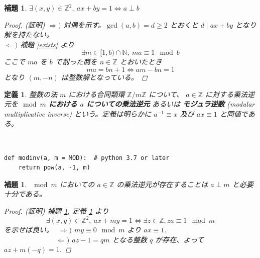 \documentclass[12pt, a4j]{ltjsarticle}
\newtheorem{lem}[thm]{補題}
\newtheorem{defi}[thm]{定義}
\newcommand*{\ZZ}{\mathbb{Z}}
\begin{document}
\begin{lem} $\exists (x,y)\in\mathbb{Z}^2,\ ax+by=1 \Longleftrightarrow a\perp b$ \label{dout2}
\begin{proof} (証明) $\Longrightarrow)$ 対偶を示す。$\gcd(a,b)=d\ge2$ とおくと $d \mid ax+by$ となり解を持たない。 \\
$\Longleftarrow)$ 補題 \ref{exists} より
\begin{equation}
\exists m \in [1,b)\cap\mathbb{N},\ ma\equiv 1 \mod b
\end{equation}
ここで $ma$ を $b$ で割った商を $n\in\mathbb{Z}$ とおいたとき\\
\begin{equation}
ma=bn+1 \Longleftrightarrow am-bn = 1
\end{equation}
となり $(m,-n)$ は整数解となっている。
\end{proof}
\end{lem}

\vspace{1cm}

\begin{defi} \label{modulardef}
整数の法 $m$ における合同類環 $\ZZ/m\ZZ$ について、 $a\in\ZZ$ に対する乗法逆元を{\bf \mbox{\boldmath $\mod m$} における \mbox{\boldmath $a$} についての乗法逆元} あるいは {\bf モジュラ逆数} (modular multiplicative inverse) という。定義は明らかに $a^{-1}\equiv x$ 及び $ax\equiv 1$ と同値である。
\end{defi}
\\
\begin{lstlisting}
def modinv(a, m = MOD):  # python 3.7 or later
    return pow(a, -1, m)
\end{lstlisting}

\vspace{1cm}

\begin{lem} \label{dout}
$\mod m$ においての $a\in\ZZ$ の乗法逆元が存在することは $a \perp m$ と必要十分である。
\begin{proof}(証明)	\itshape
補題 \ref{dout2}, 定義 \ref{modulardef} より
\begin{equation}
\exists (x,y)\in\ZZ^2,\ ax+my=1 \Longleftrightarrow \exists z \in \ZZ, za \equiv 1 \mod m
\end{equation}
を示せば良い。\,\,
$\Longrightarrow)$ $my\equiv 0\mod m$ より $ax\equiv 1$. \\　　　　　　　
$\Longleftarrow)$  $az-1=qm$ となる整数 $q$ が存在、よって $az+m(-q)=1$.
\end{proof}
\end{lem}
\end{document}
